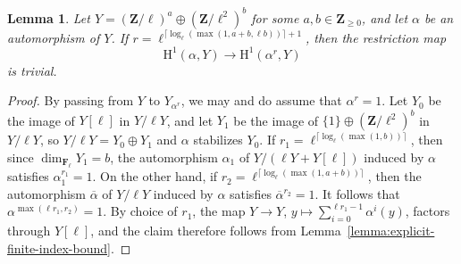 \documentclass[reqno]{amsart}
\numberwithin{equation}{subsection}
\newcommand{\F}{\mathbf{F}}
\newcommand{\Z}{\mathbf{Z}}
\newcommand{\ol}[1]{\overline{#1}}
\newcommand{\rH}{\ensuremath{\mathrm{H}}\xspace}
\newtheorem{lemma}[thm]{Lemma}
\theoremstyle{remark}
\numberwithin{equation}{subsection}
\numberwithin{figure}{subsection}
\begin{document}
\begin{lemma}\label{lemma:2-group-explicit-restriction}
Let $Y = (\Z/\ell)^a \oplus (\Z/\ell^2)^b$ for some $a, b \in \Z_{\geq 0}$, and let $\alpha$ be an automorphism of $Y$. If $r = \ell^{\lceil\log_\ell(\max(1, a+b, \ell b))\rceil+1}$, then the restriction map
\[
\rH^1(\alpha, Y) \to \rH^1(\alpha^r, Y)
\]
is trivial.
\end{lemma}

\begin{proof}
By passing from $Y$ to $Y_{\alpha^r}$, we may and do assume that $\alpha^r = 1$. Let $Y_0$ be the image of $Y[\ell]$ in $Y/\ell Y$, and let $Y_1$ be the image of $\{1\} \oplus (\Z/\ell^2)^b$ in $Y/\ell Y$, so $Y/\ell Y = Y_0 \oplus Y_1$ and $\alpha$ stabilizes $Y_0$. If $r_1 = \ell^{\lceil\log_\ell(\max(1,b))\rceil}$, then since $\dim_{\F_\ell} Y_1 = b$, the automorphism $\alpha_1$ of $Y/(\ell Y + Y[\ell])$ induced by $\alpha$ satisfies $\alpha_1^{r_1} = 1$. On the other hand, if $r_2 = \ell^{\lceil\log_\ell(\max(1, a+b))\rceil}$, then the automorphism $\ol\alpha$ of $Y/\ell Y$ induced by $\alpha$ satisfies $\ol\alpha^{r_2} = 1$. It follows that $\alpha^{\max(\ell r_1, r_2)} = 1$. By choice of $r_1$, the map $Y \to Y$, $y \mapsto \sum_{i=0}^{\ell r_1 - 1} \alpha^i(y)$, factors through $Y[\ell]$, and the claim therefore follows from Lemma~\ref{lemma:explicit-finite-index-bound}.
\end{proof}
\end{document}
